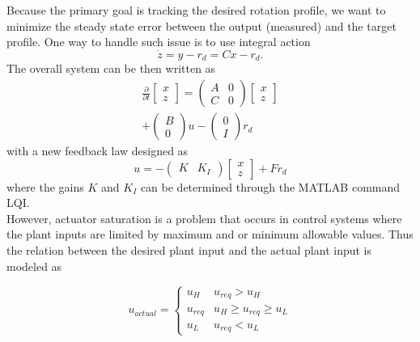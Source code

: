\documentclass[12pt]{iopart}
\begin{document}
Because the primary goal is tracking the desired rotation profile, we want to minimize the steady state error between the output (measured) and the target profile. One way to handle such issue is to use integral action
\begin{equation}
	\dot{z} = y - r_{d} = C x - r_{d}.
	\label{integral}
\end{equation}
The overall system can be then written as
\begin{multline}
\frac{\partial}{\partial t}   \left[\! \begin{array}{c}  x \\ z \end{array}\!\right]
  ={ \left(\! \begin{array}{cc} A  & 0 \\ C & 0 \end{array} \! \right)} \left[\! \begin{array}{c} x \\ z    \end{array}  \!\right] \\
  + \left(\! \begin{array}{c} B   \\ 0    \end{array}  \!\right) u -  \left(\! \begin{array}{c}  0 \\ I \end{array}\!\right) r_{d}
\label{int2}
\end{multline}
with a new feedback law designed as
\begin{equation}
u =   - \left(\! \begin{array}{cc}  K & K_I\end{array}\!\right) \left[\! \begin{array}{c}  x \\ z \end{array}\!\right] + F r_{d}
\end{equation}
where the gains $K$ and $K_I$ can be determined through the MATLAB command LQI.\\

However, actuator saturation is a problem that occurs in control systems where the plant inputs are limited by maximum and or minimum allowable values. Thus the relation between the desired plant input and the actual plant input is modeled as

\[
    u_{actual} = 
\begin{cases}
    u_{H} & u_{req} > u_{H} \\
    u_{req} &  u_{H} \ge u_{req} \ge u_{L} \\
    u_{L}              & u_{req} < u_{L}
\end{cases}
\]
\end{document}
